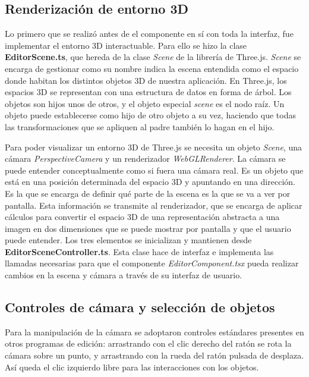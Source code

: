 \subsection{Renderización de entorno 3D}

Lo primero que se realizó antes de el componente en sí con toda la interfaz, fue implementar el entorno 3D interactuable. Para ello se hizo la clase \textbf{EditorScene.ts}, que hereda de la clase \textit{Scene} de la librería de Three.js. \textit{Scene} se encarga de gestionar como su nombre indica la escena entendida como el espacio donde habitan los distintos objetos 3D de nuestra aplicación. En Three.js, los espacios 3D se representan con una estructura de datos en forma de árbol. Los objetos son hijos unos de otros, y el objeto especial \textit{scene} es el nodo raíz. Un objeto puede establecerse como hijo de otro objeto a su vez, haciendo que todas las transformaciones que se apliquen al padre también lo hagan en el hijo.

Para poder visualizar un entorno 3D de Three.js se necesita un objeto \textit{Scene}, una cámara \textit{PerspectiveCamera} y un renderizador \textit{WebGLRenderer}. La cámara se puede entender conceptualmente como si fuera una cámara real. Es un objeto que está en una posición determinada del espacio 3D y apuntando en una dirección. Es la que se encarga de definir qué parte de la escena es la que se va a ver por pantalla. Esta información se transmite al renderizador, que se encarga de aplicar cálculos para convertir el espacio 3D de una representación abstracta a una imagen en dos dimensiones que se puede mostrar por pantalla y que el usuario puede entender. Los tres elementos se inicializan y mantienen desde \textbf{EditorSceneController.ts}. Esta clase hace de interfaz e implementa las llamadas necesarias para que el componente \textit{EditorComponent.tsx} pueda realizar cambios en la escena y cámara a través de su interfaz de usuario.

\subsection{Controles de cámara y selección de objetos}

Para la manipulación de la cámara se adoptaron controles estándares presentes en otros programas de edición: arrastrando con el clic derecho del ratón se rota la cámara sobre un punto, y arrastrando con la rueda del ratón pulsada de desplaza. Así queda el clic izquierdo libre para las interacciones con los objetos.

